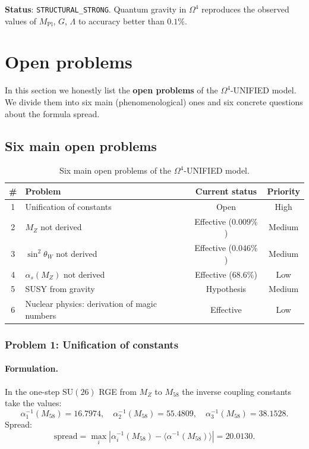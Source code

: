 \documentclass[11pt,a4paper]{article}
\newcommand{\SU}{\ensuremath{\mathrm{SU}}}
\newcommand{\Om}{\ensuremath{\Omega^4}}
\theoremstyle{definition}
\begin{document}
\medskip\noindent
\textbf{Status}: \texttt{STRUCTURAL\_STRONG}. Quantum gravity
in $\Om$ reproduces the observed values of
$M_{\text{Pl}}$, $G$, $\Lambda$ to accuracy better than $0.1\%$.
\section{Open problems}
\label{sec:open}

In this section we honestly list the \textbf{open problems}
of the $\Om$-UNIFIED model. We divide them into six main
(phenomenological) ones and six concrete questions about the formula
spread.

\subsection{Six main open problems}
\label{subsec:open-six}

\begin{table}[ht]
\centering
\caption{Six main open problems of the \texorpdfstring{$\Om$}{}-UNIFIED model.}
\label{tab:six-open-problems}
\begin{tabular}{clcc}
\toprule
\# & Problem & Current status & Priority \\
\midrule
1 & Unification of constants & Open & High \\
2 & $M_Z$ not derived & Effective ($0.009\%$) & Medium \\
3 & $\sin^2\theta_W$ not derived & Effective ($0.046\%$) & Medium \\
4 & $\alpha_s(M_Z)$ not derived & Effective ($68.6\%$) & Low \\
5 & SUSY from gravity & Hypothesis & Medium \\
6 & Nuclear physics: derivation of magic numbers & Effective & Low \\
\bottomrule
\end{tabular}
\end{table}

\subsubsection{Problem 1: Unification of constants}

\paragraph{Formulation.}
In the one-step $\SU(26)$ RGE from $M_Z$ to $M_{58}$
the inverse coupling constants take the values:
\begin{equation}
    \alpha_1^{-1}(M_{58}) = 16.7974, \quad
    \alpha_2^{-1}(M_{58}) = 55.4809, \quad
    \alpha_3^{-1}(M_{58}) = 38.1528.
\end{equation}
Spread:
\begin{equation}
    \text{spread} = \max_i |\alpha_i^{-1}(M_{58})
    - \langle \alpha^{-1}(M_{58}) \rangle| = 20.0130.
\end{equation}
\end{document}
